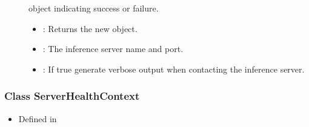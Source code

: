 \documentclass[letterpaper,10pt,english]{sphinxmanual}
\begin{document}
\begin{fulllineitems}
\begin{fulllineitems}
\begin{description}
\item[{}] \leavevmode
{\hyperref[\detokenize{cpp_api/classnvidia_1_1inferenceserver_1_1client_1_1Error:classnvidia_1_1inferenceserver_1_1client_1_1Error}]{}} object indicating success or failure. 

\item[{}] \leavevmode\begin{itemize}
\item {} 
: Returns the new {\hyperref[\detokenize{cpp_api/classnvidia_1_1inferenceserver_1_1client_1_1ProfileContext:classnvidia_1_1inferenceserver_1_1client_1_1ProfileContext}]{}} object. 

\item {} 
: The inference server name and port. 

\item {} 
: If true generate verbose output when contacting the inference server. 

\end{itemize}

\end{description}


\end{fulllineitems}


\end{fulllineitems}



\subsubsection{Class ServerHealthContext}
\label{\detokenize{cpp_api/classnvidia_1_1inferenceserver_1_1client_1_1ServerHealthContext:class-serverhealthcontext}}\label{\detokenize{cpp_api/classnvidia_1_1inferenceserver_1_1client_1_1ServerHealthContext:exhale-class-classnvidia-1-1inferenceserver-1-1client-1-1serverhealthcontext}}\label{\detokenize{cpp_api/classnvidia_1_1inferenceserver_1_1client_1_1ServerHealthContext::doc}}\begin{itemize}
\item {} 
Defined in {\hyperref[\detokenize{cpp_api/file_src_clients_c++_request.h:file-src-clients-c-request-h}]{}}

\end{itemize}
\end{document}
